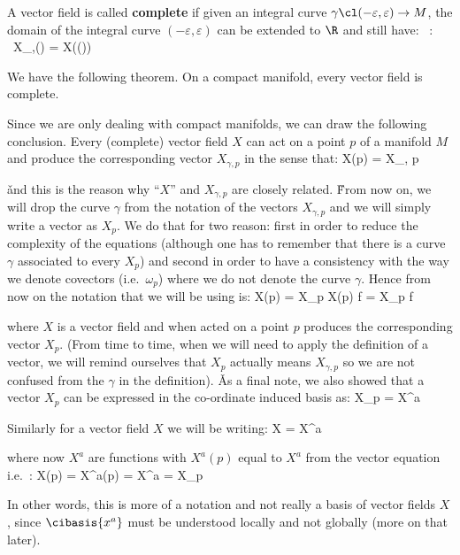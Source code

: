 A vector field is called \textbf{complete} if given an integral curve $\gamma\cl(-\varepsilon,\varepsilon)\to M$, the
domain of the integral curve $(-\varepsilon,\varepsilon)$ can be extended to $\R$ and still have:
\bse
\forall \, \lambda \in \R : \ X_{\gamma,\gamma(\lambda)} = X(\gamma(\lambda))
\ese
\ed

We have the following theorem.
\bt[]
On a compact manifold, every vector field is complete.
\et

Since we are only dealing with compact manifolds, we can draw the following conclusion. Every (complete) vector field
$X$ can act on a point $p$ of a manifold $M$ and produce the corresponding vector $X_{\gamma, p}$ in the sense that:
\bse
X(p) = X_{\gamma, p}
\ese

\v

and this is the reason why ``$X$'' and $X_{\gamma, p}$ are closely related. \v

From now on, we will drop the curve $\gamma$ from the notation of the vectors $X_{\gamma, p}$ and we will simply
write a vector as $X_p$. We do that for two reason: first in order to reduce the complexity of the equations
(although one has to remember that there is a curve $\gamma$ associated to every $X_p$) and second in order to have a
consistency with the way we denote covectors (i.e.\ $\omega_p$) where we do not denote the curve $\gamma$. Hence from
now on the notation that we will be using is:
\bse
X(p) = X_p \implies X(p) f = X_p f
\ese

where $X$ is a vector field and when acted on a point $p$ produces the corresponding vector $X_p$. (From time to
time, when we will need to apply the definition of a vector, we will remind ourselves that $X_p$ actually means
$X_{\gamma, p}$ so we are not confused from the $\gamma$ in the definition). \v

As a final note, we also showed that a vector $X_p$ can be expressed in the co-ordinate induced basis as:
\bse
X_{p} = X^a 
\ese

Similarly for a vector field $X$ we will be writing:
\bse
X = X^a 
\ese

where now $X^a$ are functions with $X^a(p)$ equal to $X^a$ from the vector equation i.e.\ :
\bse
X(p) = X^a(p)  = X^a  = X_p
\ese

In other words, this is more of a notation and not really a basis of vector fields $X$, since $\cibasis{x^a}$ must be
understood locally and not globally (more on that later).

